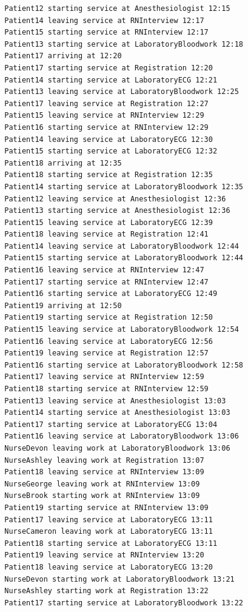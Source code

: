 \documentclass[12pt]{article}
\begin{document}
\begin{verbatim}
		Patient12 starting service at Anesthesiologist 12:15
		Patient14 leaving service at RNInterview 12:17
		Patient15 starting service at RNInterview 12:17
		Patient13 starting service at LaboratoryBloodwork 12:18
		Patient17 arriving at 12:20
		Patient17 starting service at Registration 12:20
		Patient14 starting service at LaboratoryECG 12:21
		Patient13 leaving service at LaboratoryBloodwork 12:25
		Patient17 leaving service at Registration 12:27
		Patient15 leaving service at RNInterview 12:29
		Patient16 starting service at RNInterview 12:29
		Patient14 leaving service at LaboratoryECG 12:30
		Patient15 starting service at LaboratoryECG 12:32
		Patient18 arriving at 12:35
		Patient18 starting service at Registration 12:35
		Patient14 starting service at LaboratoryBloodwork 12:35
		Patient12 leaving service at Anesthesiologist 12:36
		Patient13 starting service at Anesthesiologist 12:36
		Patient15 leaving service at LaboratoryECG 12:39
		Patient18 leaving service at Registration 12:41
		Patient14 leaving service at LaboratoryBloodwork 12:44
		Patient15 starting service at LaboratoryBloodwork 12:44
		Patient16 leaving service at RNInterview 12:47
		Patient17 starting service at RNInterview 12:47
		Patient16 starting service at LaboratoryECG 12:49
		Patient19 arriving at 12:50
		Patient19 starting service at Registration 12:50
		Patient15 leaving service at LaboratoryBloodwork 12:54
		Patient16 leaving service at LaboratoryECG 12:56
		Patient19 leaving service at Registration 12:57
		Patient16 starting service at LaboratoryBloodwork 12:58
		Patient17 leaving service at RNInterview 12:59
		Patient18 starting service at RNInterview 12:59
		Patient13 leaving service at Anesthesiologist 13:03
		Patient14 starting service at Anesthesiologist 13:03
		Patient17 starting service at LaboratoryECG 13:04
		Patient16 leaving service at LaboratoryBloodwork 13:06
		NurseDevon leaving work at LaboratoryBloodwork 13:06
		NurseAshley leaving work at Registration 13:07
		Patient18 leaving service at RNInterview 13:09
		NurseGeorge leaving work at RNInterview 13:09
		NurseBrook starting work at RNInterview 13:09
		Patient19 starting service at RNInterview 13:09
		Patient17 leaving service at LaboratoryECG 13:11
		NurseCameron leaving work at LaboratoryECG 13:11
		Patient18 starting service at LaboratoryECG 13:11
		Patient19 leaving service at RNInterview 13:20
		Patient18 leaving service at LaboratoryECG 13:20
		NurseDevon starting work at LaboratoryBloodwork 13:21
		NurseAshley starting work at Registration 13:22
		Patient17 starting service at LaboratoryBloodwork 13:22

\end{verbatim}
\end{document}
